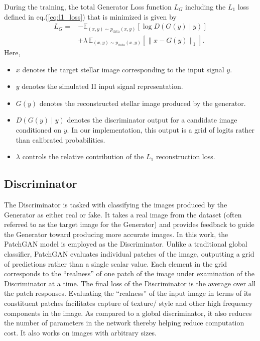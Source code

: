 During the training, the total Generator Loss function $L_G$ including the $L_1$ loss defined in eq.(\ref{eq:l1_loss}) that is minimized is given by
\begin{equation}
	\begin{aligned}
		L_G ={}&
		-\mathbb{E}_{(x,y)\sim p_{\mathrm{data}}(x,y)}
		\left[\log D(G(y)\mid y)\right]\\
		&+\lambda\,
		\mathbb{E}_{(x,y)\sim p_{\mathrm{data}}(x,y)}
		\left[\|x-G(y)\|_1\right].
	\end{aligned}
	\label{eq:total_gen_loss}
\end{equation}
Here, 
\begin{itemize}
  \item \(x\) denotes the target stellar image corresponding to the input signal \(y\).
  \item \(y\) denotes the simulated II input signal representation.
  \item \(G(y)\) denotes the reconstructed stellar image produced by the generator. 
  \item \(D(G(y)\mid y)\) denotes the discriminator output for a candidate image conditioned on \(y\). In our implementation, this output is a grid of logits rather than calibrated probabilities.
  \item \(\lambda\) controls the relative contribution of the \(L_1\) reconstruction loss. 
\end{itemize}

\subsection{Discriminator}
The Discriminator is tasked with classifying the images produced by the Generator as either real or fake. It takes a real image from the dataset (often referred to as the target image for the Generator) and provides feedback to guide the Generator toward producing more accurate images. In this work, the PatchGAN model \citep{isola2017image} is employed as the Discriminator. Unlike a traditional global classifier, PatchGAN evaluates individual patches of the image, outputting a grid of predictions rather than a single scalar value. Each element in the grid corresponds to the ``realness'' of one patch of the image under examination of the Discriminator at a time. The final loss of the Discriminator is the average over all the patch responses. Evaluating the ``realness'' of the input image in terms of its constituent patches facilitates capture of texture/ style and other high frequency components in the image. As compared to a global discriminator, it also reduces the number of parameters in the network thereby helping reduce computation cost. It also works on images with arbitrary sizes.

